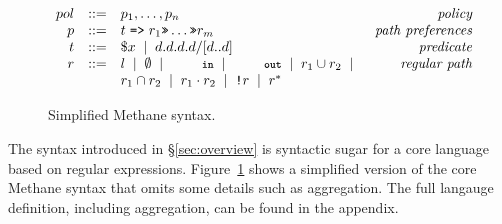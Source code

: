 \documentclass[numbers, 10pt, preprint]{sigplanconf}
\newcommand{\sysname}{{\small \sf Methane}\xspace}
\newcommand{\KW}[1]{\texttt{\small\bfseries{#1}}}
\newcommand{\Prefer}{\texttt{>>}}
\newcommand{\Path}{\texttt{=>}}
\newcommand{\In}{\KW{in}}
\newcommand{\Out}{\KW{out}}
\newcommand{\NOT}{\texttt{!}}
\newcommand{\BNFALT}{\;\;|\;\;}
\begin{document}
\begin{figure}[t]\small
  \begin{minipage}[t]{\linewidth}
  \vspace*{-1\baselineskip}
  \[ \begin{array}{rclr}
     pol     &::=& p_1, \dots, p_n & \textit{policy} \\
     p       &::=& t \hspace{.3em} \Path \hspace{.3em} r_1 \Prefer \dots \Prefer r_m & \textit{path preferences} \\
     t       &::=& \$x \BNFALT d.d.d.d/[d..d] \hspace{1.5em} & \textit{predicate} \\
     r       &::=& l \BNFALT \emptyset \BNFALT \In \BNFALT \Out \BNFALT r_1 \cup r_2 \BNFALT & \textit{regular path} \\
             &   & r_1 \cap r_2 \BNFALT r_1 \cdot r_2 \BNFALT \NOT r \BNFALT r^* \\
  \end{array} \]%

  \end{minipage}
  \vspace{-.3em}
  \caption{Simplified \sysname syntax.}
  \label{fig:syntax}
\end{figure}%

The syntax introduced in \S\ref{sec:overview} is syntactic sugar for a core language based on regular expressions. Figure~\ref{fig:syntax} shows a simplified version of the core \sysname syntax that omits some details such as aggregation. The full langauge definition, including aggregation, can be found in the appendix.
\end{document}
